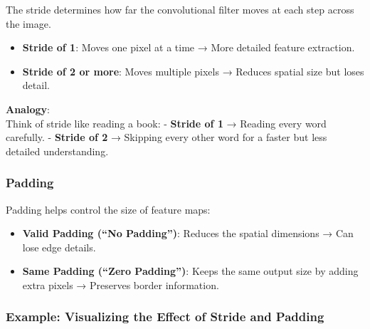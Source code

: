 \documentclass[
  letterpaper,
  DIV=11,
  numbers=noendperiod]{scrreprt}
\providecommand{\tightlist}{%
  \setlength{\itemsep}{0pt}\setlength{\parskip}{0pt}}\usepackage{longtable,booktabs,array}
\begin{document}
The stride determines how far the convolutional filter moves at each
step across the image.

\begin{itemize}
\tightlist
\item
  \textbf{Stride of 1}: Moves one pixel at a time → More detailed
  feature extraction.
\item
  \textbf{Stride of 2 or more}: Moves multiple pixels → Reduces spatial
  size but loses detail.
\end{itemize}

\textbf{Analogy}:\\
Think of stride like reading a book: - \textbf{Stride of 1} → Reading
every word carefully. - \textbf{Stride of 2} → Skipping every other word
for a faster but less detailed understanding.

\subsubsection{Padding}\label{padding}

Padding helps control the size of feature maps:

\begin{itemize}
\tightlist
\item
  \textbf{Valid Padding (``No Padding'')}: Reduces the spatial
  dimensions → Can lose edge details.
\item
  \textbf{Same Padding (``Zero Padding'')}: Keeps the same output size
  by adding extra pixels → Preserves border information.
\end{itemize}

\subsubsection{Example: Visualizing the Effect of Stride and
Padding}\label{example-visualizing-the-effect-of-stride-and-padding}
\end{document}
